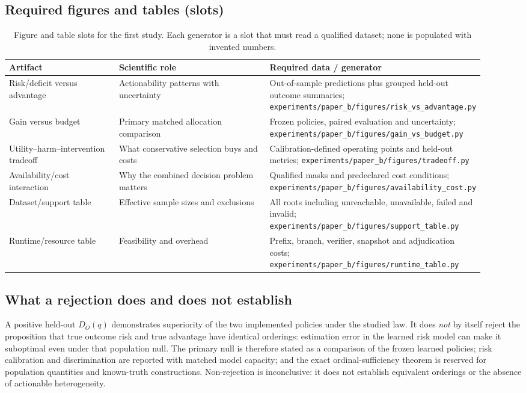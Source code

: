 \subsection{Required figures and tables (slots)}

\begin{table}[t]
\centering
\small
\setlength{\tabcolsep}{4pt}
\begin{tabular}{@{}p{0.24\linewidth}p{0.34\linewidth}p{0.34\linewidth}@{}}
\toprule
Artifact & Scientific role & Required data / generator \\
\midrule
Risk/deficit versus advantage & Actionability patterns with uncertainty &
Out-of-sample predictions plus grouped held-out outcome summaries;
\texttt{experiments/paper\_b/figures/risk\_vs\_advantage.py} \\
Gain versus budget & Primary matched allocation comparison &
Frozen policies, paired evaluation and uncertainty;
\texttt{experiments/paper\_b/figures/gain\_vs\_budget.py} \\
Utility--harm--intervention tradeoff & What conservative selection buys and
costs & Calibration-defined operating points and held-out metrics;
\texttt{experiments/paper\_b/figures/tradeoff.py} \\
Availability/cost interaction & Why the combined decision problem matters &
Qualified masks and predeclared cost conditions;
\texttt{experiments/paper\_b/figures/availability\_cost.py} \\
Dataset/support table & Effective sample sizes and exclusions & All roots
including unreachable, unavailable, failed and invalid;
\texttt{experiments/paper\_b/figures/support\_table.py} \\
Runtime/resource table & Feasibility and overhead & Prefix, branch, verifier,
snapshot and adjudication costs;
\texttt{experiments/paper\_b/figures/runtime\_table.py} \\
\bottomrule
\end{tabular}
\caption{Figure and table slots for the first study.  Each generator is a slot
that must read a qualified dataset; none is populated with invented numbers.}
\label{tab:b-figure-slots}
\end{table}

\subsection{What a rejection does and does not establish}
\label{sec:b-rejection}

A positive held-out $D_O(q)$ demonstrates superiority of the two implemented
policies under the studied law.  It does \emph{not} by itself reject the
proposition that true outcome risk and true advantage have identical
orderings: estimation error in the learned risk model can make it suboptimal
even under that population null.  The primary null is therefore stated as a
comparison of the frozen learned policies; risk calibration and discrimination
are reported with matched model capacity; and the exact ordinal-sufficiency
theorem is reserved for population quantities and known-truth constructions.
Non-rejection is inconclusive: it does not establish equivalent orderings or the
absence of actionable heterogeneity.
